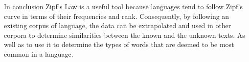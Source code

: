 In conclusion Zipf's Law is a useful tool because languages tend to follow Zipf's curve in terms of their frequencies and rank. Consequently, by following an existing corpus of language, the data can be extrapolated and used in other corpora to determine similarities between the known and the unknown texts. As well as to use it to determine the types of words that are deemed to be most common in a language.